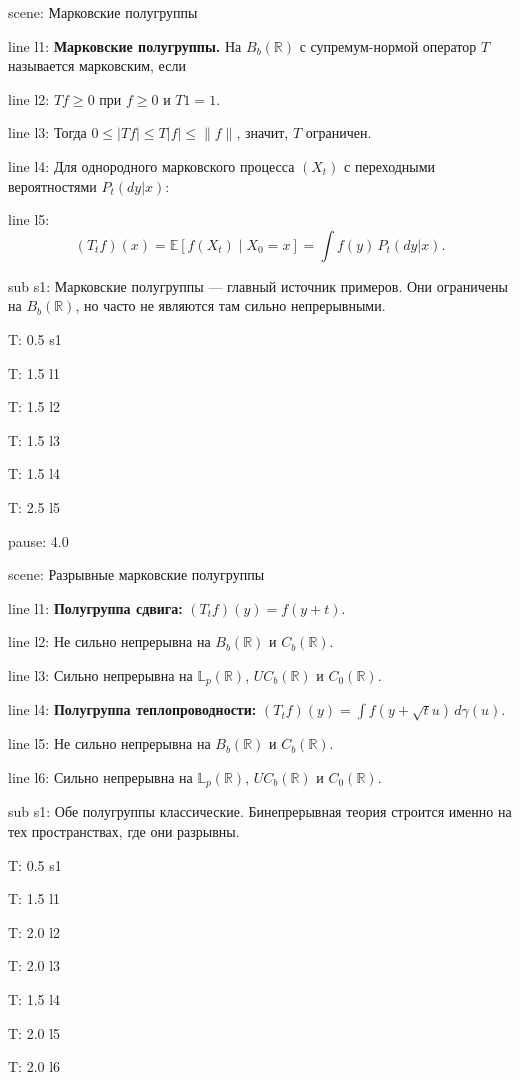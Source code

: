 \documentclass[a4paper,11pt]{article}
\newcommand{\R}{\mathbb{R}}
\newcommand{\Lp}{\mathbb{L}}
\newcommand{\E}{\mathbb{E}}
\begin{document}

scene: {Марковские полугруппы}

line l1: {\textbf{Марковские полугруппы.} На $B_b(\R)$ с супремум-нормой оператор $T$ называется марковским, если}

line l2: {$Tf\ge0$ при $f\ge0$ и $T1=1$.}

line l3: {Тогда $0\le|Tf|\le T|f|\le\|f\|$, значит, $T$ ограничен.}

line l4: {Для однородного марковского процесса $(X_t)$ с переходными вероятностями $P_t(dy|x)$:}

line l5: {$$(T_t f)(x)=\E[f(X_t)\mid X_0=x]=\int f(y)\,P_t(dy|x).$$}


sub s1: {Марковские полугруппы --- главный источник примеров. Они ограничены на $B_b(\R)$, но часто не являются там сильно непрерывными.}


T: 0.5 s1

T: 1.5 l1

T: 1.5 l2

T: 1.5 l3

T: 1.5 l4

T: 2.5 l5

pause: 4.0



scene: {Разрывные марковские полугруппы}

line l1: {\textbf{Полугруппа сдвига:} $(T_t f)(y)=f(y+t)$.}

line l2: {Не сильно непрерывна на $B_b(\R)$ и $C_b(\R)$.}

line l3: {Сильно непрерывна на $\Lp_p(\R)$, $UC_b(\R)$ и $C_0(\R)$.}

line l4: {\textbf{Полугруппа теплопроводности:} $(T_t f)(y)=\int f(y+\sqrt{t}u)\,d\gamma(u)$.}

line l5: {Не сильно непрерывна на $B_b(\R)$ и $C_b(\R)$.}

line l6: {Сильно непрерывна на $\Lp_p(\R)$, $UC_b(\R)$ и $C_0(\R)$.}


sub s1: {Обе полугруппы классические. Бинепрерывная теория строится именно на тех пространствах, где они разрывны.}


T: 0.5 s1

T: 1.5 l1

T: 2.0 l2

T: 2.0 l3

T: 1.5 l4

T: 2.0 l5

T: 2.0 l6
\end{document}

